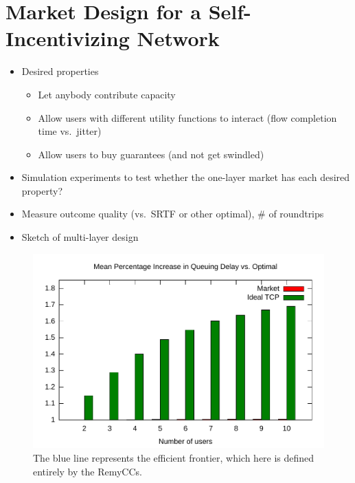 \section{Market Design for a Self-Incentivizing Network}
\label{sec:designs}

\begin{itemize}

\item Desired properties

\begin{itemize}

\item Let anybody contribute capacity

\item Allow users with different utility functions to interact (flow completion time vs.~jitter)

\item Allow users to buy guarantees (and not get swindled)

\end{itemize}

\item Simulation experiments to test whether the one-layer market has each desired property?

\item Measure outcome quality (vs.~SRTF or other optimal), \# of roundtrips

\item Sketch of multi-layer design

\end{itemize}

\begin{figure}
\includegraphics[width=\columnwidth]{plots/delay_over_srtf.pdf}
\caption{The blue line represents the efficient frontier, which here is defined entirely by the RemyCCs.}
\label{f:delay_over_srtf}
\end{figure}

